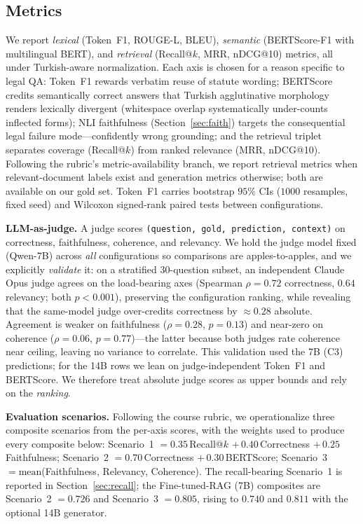 \documentclass[conference]{IEEEtran}
\begin{document}
\subsection{Metrics}
We report \emph{lexical} (Token~F1, ROUGE-L, BLEU), \emph{semantic} (BERTScore-F1
with multilingual BERT), and \emph{retrieval} (Recall@$k$, MRR, nDCG@10) metrics,
all under Turkish-aware normalization. Each axis is chosen for a reason specific
to legal QA: Token~F1 rewards verbatim reuse of statute wording; BERTScore credits
semantically correct answers that Turkish agglutinative morphology renders
lexically divergent (whitespace overlap systematically under-counts inflected
forms); NLI faithfulness (Section~\ref{sec:faith}) targets the consequential legal
failure mode---confidently wrong grounding; and the retrieval triplet separates coverage
(Recall@$k$) from ranked relevance (MRR, nDCG@10). Following the rubric's
metric-availability branch, we report retrieval metrics when relevant-document
labels exist and generation metrics otherwise; both are available on our gold
set. Token~F1 carries bootstrap $95\%$ CIs ($1000$ resamples, fixed seed) and
Wilcoxon signed-rank paired tests between configurations.

\textbf{LLM-as-judge.} A judge scores \texttt{(question, gold, prediction,
context)} on correctness, faithfulness, coherence, and relevancy. We hold the
judge model fixed (Qwen-7B) across \emph{all} configurations so comparisons are
apples-to-apples, and we explicitly \emph{validate} it: on a stratified
$30$-question subset, an independent Claude Opus judge agrees on the load-bearing
axes (Spearman $\rho{=}0.72$ correctness, $0.64$ relevancy; both $p{<}0.001$),
preserving the configuration ranking, while revealing that the same-model judge
over-credits correctness by $\approx 0.28$ absolute. Agreement is weaker on
faithfulness ($\rho{=}0.28$, $p{=}0.13$) and near-zero on coherence
($\rho{=}0.06$, $p{=}0.77$)---the latter because both judges rate coherence near
ceiling, leaving no variance to correlate. This validation used the 7B (C3)
predictions; for the 14B rows we lean on judge-independent Token~F1 and
BERTScore. We therefore treat absolute judge scores as upper bounds and rely on
the \emph{ranking}.

\textbf{Evaluation scenarios.} Following the course rubric, we operationalize
three composite scenarios from the per-axis scores, with the weights used to
produce every composite below: Scenario~1 $=0.35\,$Recall@$k$ $+\,0.40\,$Correctness
$+\,0.25\,$Faithfulness; Scenario~2 $=0.70\,$Correctness $+\,0.30\,$BERTScore;
Scenario~3 $=\mathrm{mean}$(Faithfulness, Relevancy, Coherence). The recall-bearing
Scenario~1 is reported in Section~\ref{sec:recall}; the Fine-tuned-RAG (7B)
composites are Scenario~2 $=0.726$ and Scenario~3 $=0.805$, rising to $0.740$ and
$0.811$ with the optional 14B generator.
\end{document}
